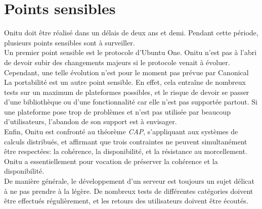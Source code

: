 \section{Points sensibles}
Onitu doit être réalisé dans un délais de deux ans et demi. Pendant cette période, plusieurs points sensibles sont à surveiller.\\

Un premier point sensible est le protocole d'Ubuntu One. Onitu n'est pas à l'abri de devoir subir des changements majeurs si le protocole venait à évoluer. Cependant, une telle évolution n'est pour le moment pas prévue par Canonical\\

La portabilité est un autre point sensible. En effet, cela entraîne de nombreux tests sur un maximum de plateformes possibles, et le risque de devoir se passer d'une bibliothèque ou d'une fonctionnalité car elle n'est pas supportée partout. Si une plateforme pose trop de problèmes et n'est pas utilisée par beaucoup d'utilisateurs, l'abandon de son support est à envisager.\\

Enfin, Onitu est confronté au théorème \textit{CAP}, s'appliquant aux systèmes de calculs distribués, et affirmant que trois contraintes ne peuvent simultanément être respectées: la cohérence, la disponibilité, et la résistance au morcellement. Onitu a essentiellement pour vocation de préserver la cohérence et la disponibilité.\\

De manière générale, le développement d'un serveur est toujours un sujet délicat à ne pas prendre à la légère. De nombreux tests de différentes catégories doivent être effectués régulièrement, et les retours des utilisateurs doivent être écoutés.